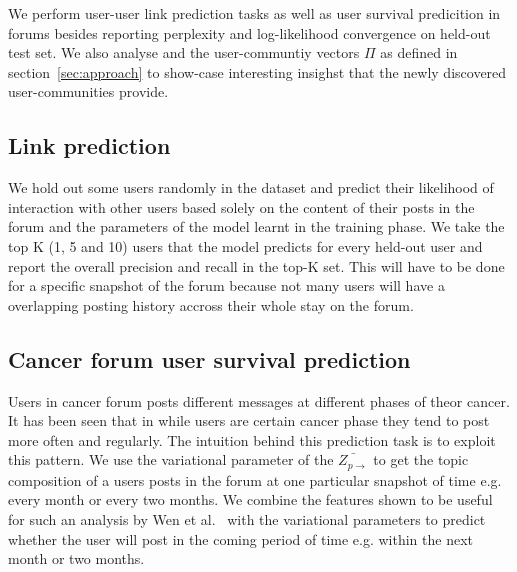 We perform user-user link prediction tasks as well as user survival predicition
in forums besides reporting perplexity and log-likelihood convergence on
held-out test set. We also analyse and the user-communtiy vectors $\Pi$ as
defined in section~\ref{sec:approach} to show-case interesting insighst that the
newly discovered user-communities provide. 

\subsection{Link prediction}
We hold out some users randomly in the dataset and predict their
likelihood of interaction with other users based solely on the content of their
posts in the forum and the parameters of the model learnt in the training phase. 
We take the top K (1, 5 and 10) users that the model predicts for every held-out
user and report the overall precision and recall in the top-K set. This will
have to be done for a specific snapshot of the forum because not many users will
have a overlapping posting history accross their whole stay on the forum.

\subsection{Cancer forum user survival prediction}
Users in cancer forum posts different messages at different phases of theor
cancer. It has been seen that in while users are certain cancer phase they tend
to post more often and regularly. The intuition behind this prediction task is
to exploit this pattern. We use the variational parameter of the
$\bar{Z_{p\rightarrow}}$ to get the topic composition of a users posts in the
forum at one particular snapshot of time e.g. every month or every two months.
We combine the features shown to be useful for such an analysis by Wen et
al.~\cite{Wen:2013:Carolyn} with the variational parameters to predict whether
the user will post in the coming period of time e.g. within the next month or
two months.
